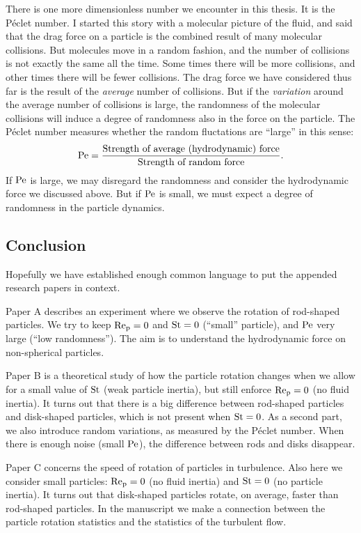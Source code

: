 \documentclass[thesis.tex]{subfiles}
\begin{document}
There is one more dimensionless number we encounter in this thesis. It is the P\'eclet number. I started this story with a molecular picture of the fluid, and said that the drag force on a particle is the combined result of many molecular collisions. But molecules move in a random fashion, and the number of collisions is not exactly the same all the time. Some times there will be more collisions, and other times there will be fewer collisions. The drag force we have considered thus far is the result of the \emph{average} number of collisions. But if the \emph{variation} around the average number of collisions is large, the randomness of the molecular collisions will induce a degree of randomness also in the force on the particle. The P\'eclet number measures whether the random fluctations are ``large'' in this sense:
\begin{align*}
    \mbox{Pe} = \frac{\textrm{Strength of average (hydrodynamic) force}}{\textrm{Strength of random force}}.
\end{align*}
If $\mbox{Pe}$ is large, we may disregard the randomness and consider the hydrodynamic force we discussed above. But if $\mbox{Pe}$ is small, we must expect a degree of randomness in the particle dynamics.

\subsection*{Conclusion}

Hopefully we have established enough common language to put the appended research papers in context.

Paper A describes an experiment where we observe the rotation of rod-shaped particles. We try to keep $\mbox{Re}_{\mathrm p}=0$ and $\mbox{St}=0$ (``small'' particle), and $\mbox{Pe}$ very large (``low randomness''). The aim is to understand the hydrodynamic force on non-spherical particles.

Paper B is a theoretical study of how the particle rotation changes when we allow for a small value of $\mbox{St}$ (weak particle inertia), but still enforce $\mbox{Re}_{\mathrm p}=0$ (no fluid inertia). It turns out that there is a big difference between rod-shaped particles and disk-shaped particles, which is not present when $\mbox{St}=0$. As a second part, we also introduce random variations, as measured by the P\'eclet number. When there is enough noise (small $\mbox{Pe}$), the difference between rods and disks disappear.

Paper C concerns the speed of rotation of particles in turbulence. Also here we consider small particles: $\mbox{Re}_{\mathrm p}=0$ (no fluid inertia) and $\mbox{St}=0$ (no particle inertia). It turns out that disk-shaped particles rotate, on average, faster than rod-shaped particles. In the manuscript we make a connection between the particle rotation statistics and the statistics of the turbulent flow. 
\end{document}

